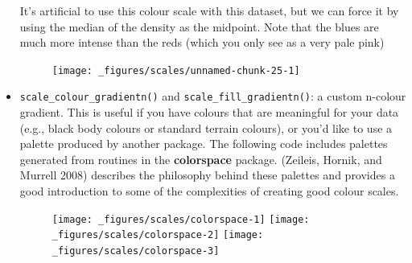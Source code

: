 \begin{itemize}
  It's artificial to use this colour scale with this dataset, but we can
  force it by using the median of the density as the midpoint. Note that
  the blues are much more intense than the reds (which you only see as a
  very pale pink)

\begin{Shaded}
\begin{Highlighting}[]
\StringTok{ }
\StringTok{ }\NormalTok{(} 
\end{Highlighting}
\end{Shaded}

  \begin{figure}[H]
    \texttt{[image: \_figures/scales/unnamed-chunk-25-1]}
  \end{figure}
\item
  \texttt{scale\_colour\_gradientn()} and
  \texttt{scale\_fill\_gradientn()}: a custom n-colour gradient. This is
  useful if you have colours that are meaningful for your data (e.g.,
  black body colours or standard terrain colours), or you'd like to use
  a palette produced by another package. The following code includes
  palettes generated from routines in the \textbf{colorspace} package.
  (Zeileis, Hornik, and Murrell 2008) describes the philosophy behind
  these palettes and provides a good introduction to some of the
  complexities of creating good colour scales. 
   

\begin{Shaded}
\begin{Highlighting}[]
\StringTok{ }\NormalTok{(} \NormalTok{(}\NormalTok{))}
\StringTok{ }\NormalTok{(} \NormalTok{(}\NormalTok{))}
\StringTok{ }\NormalTok{(} \NormalTok{(}\NormalTok{))}
\end{Highlighting}
\end{Shaded}

  \begin{figure}[H]
    \texttt{[image: \_figures/scales/colorspace-1]}%
    \texttt{[image: \_figures/scales/colorspace-2]}%
    \texttt{[image: \_figures/scales/colorspace-3]}
  \end{figure}


\end{itemize}
